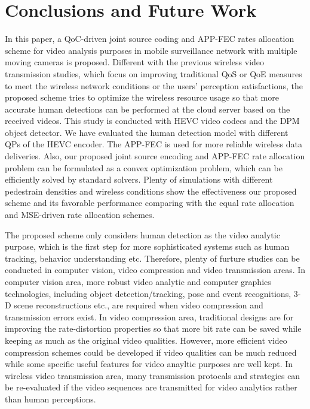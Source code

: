 \documentclass[journal]{IEEEtran}
\begin{document}
\section{Conclusions and Future Work}
In this paper, a QoC-driven joint source coding and APP-FEC rates allocation scheme for video analysis purposes in mobile surveillance network with multiple moving cameras is proposed. Different with the previous wireless video transmission studies, which focus on improving traditional QoS or QoE measures to meet the wireless network conditions or the users' perception satisfactions, the proposed scheme tries to optimize the wireless resource usage so that more accurate human detections can be performed at the cloud server based on the received videos. This study is conducted with HEVC video codecs and the DPM object detector. We have evaluated the human detection model with different QPs of the HEVC encoder. The APP-FEC is used for more reliable wireless data deliveries. Also, our proposed joint source encoding and APP-FEC rate allocation problem can be formulated as a convex optimization problem, which can be efficiently solved by standard solvers. Plenty of simulations with different pedestrain densities and wireless conditions show the effectiveness our proposed scheme and its favorable performance comparing with the equal rate allocation and MSE-driven rate allocation schemes.

The proposed scheme only considers human detection as the video analytic purpose, which is the first step for more sophisticated systems such as human tracking, behavior understanding etc. Therefore, plenty of furture studies can be conducted in computer vision, video compression and video transmission areas. In computer vision area, more robust video analytic and computer graphics technologies, including object detection/tracking, pose and event recognitions, 3-D scene reconstructions etc., are required when video compression and transmission errors exist. In video compression area, traditional designs are for improving the rate-distortion properties so that more bit rate can be saved while keeping as much as the original video qualities. However, more efficient video compression schemes could be developed if video qualities can be much reduced while some specific useful features for video anayltic purposes are well kept. In wireless video transmission area, many transmission protocals and strategies can be re-evaluated if the video sequences are transmitted for video analytics rather than human perceptions.
\appendices
\end{document}
